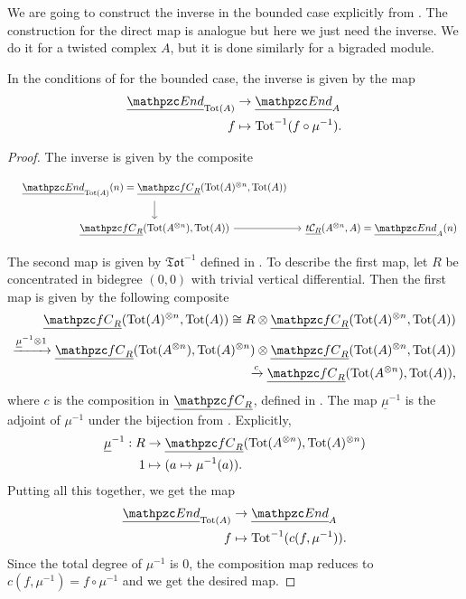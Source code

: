 \documentclass[Thesis.tex]{subfiles}
\begin{document}
We are going to construct the inverse in the bounded case explicitly from . The construction for the direct map is analogue but here we just need the inverse. We do it for a twisted complex $A$, but it is done similarly for a bigraded module.

\begin{lem}\label{composition}
In the conditions of  for the bounded case, the inverse is given by the map
\begin{align*}
\uEnd_{\Tot(A)}&\to\uEnd_A\\
f & \mapsto \Tot^{-1}(f\circ \mu^{-1}).
\end{align*}
\end{lem}
\begin{proof}
The inverse is given by the composite

\[
\begin{tikzcd}[column sep = 1em]
&\uEnd_{\Tot(A)}(n)=\ufC(\Tot(A)^{\otimes n},\Tot(A))\arrow[d]&\\
& \ufC(\Tot(A^{\otimes n}),\Tot(A))\arrow[r]&\utC(A^{\otimes n},A)=\uEnd_A(n)
\end{tikzcd}
 \]

The second map is given by $\mathfrak{Tot}^{-1}$ defined in . To describe the first map, let $R$ be concentrated in bidegree $(0,0)$ with trivial vertical differential. Then the first map is given by the following composite
\begin{align*}
\ufC(\Tot(A)^{\otimes n},\Tot(A))\cong R\otimes\ufC(\Tot(A)^{\otimes n},\Tot(A))\\
\xrightarrow{\underline{\mu}^{-1}\otimes 1}\ufC(\Tot(A^{\otimes n}),\Tot(A)^{\otimes n})\otimes\ufC(\Tot(A)^{\otimes n},\Tot(A))\\
\xrightarrow{c}\ufC(\Tot(A^{\otimes n}),\Tot(A)), 
\end{align*}
where $c$ is the composition in $\ufC$, defined in . The map $\underline{\mu}^{-1}$ is the adjoint of $\mu^{-1}$ under the bijection from . Explicitly,
\begin{align*}
\underline{\mu}^{-1}:R &\to \ufC(\Tot(A^{\otimes n}),\Tot(A)^{\otimes n})\\
1 &\mapsto (a\mapsto \mu^{-1}(a)).
\end{align*}
Putting all this together, we get the map 
\begin{align*}
\uEnd_{\Tot(A)}&\to\uEnd_A\\
f & \mapsto \Tot^{-1}(c(f, \mu^{-1})).
\end{align*}
Since the total degree of $\mu^{-1}$ is 0, the composition map reduces to $c(f,\mu^{-1})=f\circ \mu^{-1}$ and we get the desired map.
\end{proof}
\end{document}
